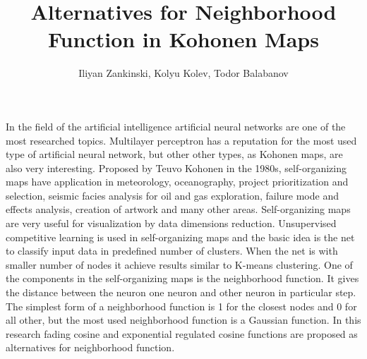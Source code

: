 \documentclass[12pt,a4paper]{article}
\title{Alternatives for Neighborhood Function in Kohonen Maps}
\author{Iliyan Zankinski, Kolyu Kolev, Todor Balabanov}
\date{\empty}
\begin{document}
 
\maketitle

In the field of the artificial intelligence artificial neural networks are one of the most researched topics. Multilayer perceptron has a reputation for the most used type of artificial neural network, but other other types, as Kohonen maps, are also very interesting. Proposed by Teuvo Kohonen in the 1980s, self-organizing maps have application in meteorology, oceanography, project prioritization and selection, seismic facies analysis for oil and gas exploration, failure mode and effects analysis, creation of artwork and many other areas. Self-organizing maps are very useful for visualization by data dimensions reduction. Unsupervised competitive learning is used in self-organizing maps and the basic idea is the net to classify input data in predefined number of clusters. When the net is with smaller number of nodes it achieve results similar to K-means clustering. One of the components in the self-organizing maps is the neighborhood function. It gives the distance between the neuron one neuron and other neuron in particular step. The simplest form of a neighborhood function is 1 for the closest nodes and 0 for all other, but the most used neighborhood function is a Gaussian function. In this research fading cosine and exponential regulated cosine functions are proposed as alternatives for neighborhood function.
\end{document}
